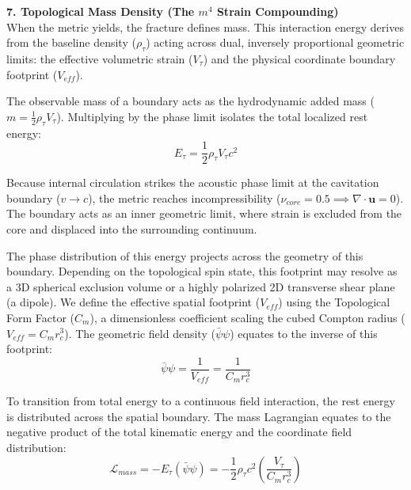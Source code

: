 \vspace{0.2 cm}

\textbf{7. Topological Mass Density (The $m^4$ Strain Compounding)}\\
When the metric yields, the fracture defines mass. This interaction energy derives from the baseline density ($\rho_\tau$) acting across dual, inversely proportional geometric limits: the effective volumetric strain ($V_\tau$) and the physical coordinate boundary footprint ($V_{eff}$).

The observable mass of a boundary acts as the hydrodynamic added mass ($m = \frac{1}{2} \rho_{\tau} V_{\tau}$). Multiplying by the phase limit isolates the total localized rest energy:
\begin{equation}
    E_\tau = \frac{1}{2} \rho_{\tau} V_{\tau} c^2 \label{eq:hydro_energy}
\end{equation}

Because internal circulation strikes the acoustic phase limit at the cavitation boundary ($v \to c$), the metric reaches incompressibility ($\nu_{core} = 0.5 \implies \nabla \cdot \mathbf{u} = 0$). The boundary acts as an inner geometric limit, where strain is excluded from the core and displaced into the surrounding continuum.

The phase distribution of this energy projects across the geometry of this boundary. Depending on the topological spin state, this footprint may resolve as a 3D spherical exclusion volume or a highly polarized 2D transverse shear plane (a dipole). We define the effective spatial footprint ($V_{eff}$) using the Topological Form Factor ($C_m$), a dimensionless coefficient scaling the cubed Compton radius ($V_{eff} = C_m r_c^3$). The geometric field density ($\bar{\psi}\psi$) equates to the inverse of this footprint:
\begin{equation}
    \bar{\psi} \psi = \frac{1}{V_{eff}} = \frac{1}{C_m r_c^3} \label{eq:field_inverse_volume}
\end{equation}

To transition from total energy to a continuous field interaction, the rest energy is distributed across the spatial boundary. The mass Lagrangian equates to the negative product of the total kinematic energy and the coordinate field distribution:
\begin{equation}
    \mathcal{L}_{mass} = - E_\tau (\bar{\psi} \psi) = - \frac{1}{2} \rho_{\tau} c^2 \left( \frac{V_{\tau}}{C_m r_c^3} \right) \nonumber
\end{equation}

